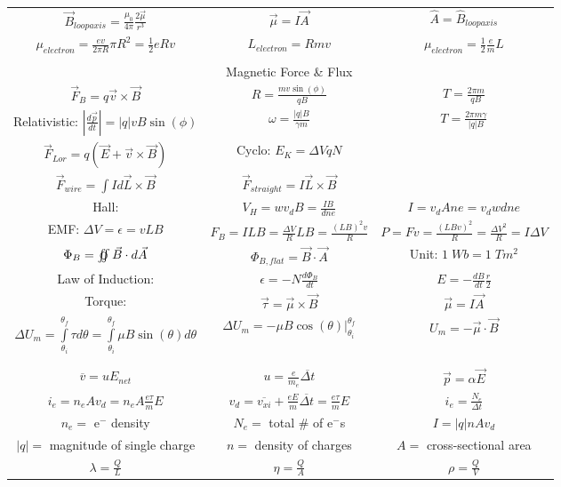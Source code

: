 \documentclass[12pt]{article}
\theoremstyle{definition}
\theoremstyle{remark}
\numberwithin{equation}{section}
\begin{document}
\begin{longtable}{c|c|c}
        $\vec{B}_{loop axis} = \frac{\mu_0}{4\pi}\frac{2\vec{\mu}}{r^3}$ & $\vec{\mu} = I\vec{A}$ & $\hat{A} = \hat{B}_{loop axis}$ \\
        $\mu_{electron} = \frac{ev}{2\pi R}\pi R^2 = \frac{1}{2}eRv$ & $L_{electron} = Rmv$ & $\mu_{electron} = \frac{1}{2}\frac{e}{m}L$ \\
        & &  \\
        & Magnetic Force \& Flux &  \\
        $\vec{F}_B = q\vec{v}\times \vec{B}$ & $R = \frac{mv\sin(\phi)}{qB}$ & $T = \frac{2\pi m}{qB}$ \\
        Relativistic: $\left|\frac{d\vec{p}}{dt}\right| = |q|vB\sin(\phi)$ & $\omega = \frac{|q|B}{\gamma m}$ & $T = \frac{2\pi m\gamma}{|q|B}$ \\
        $\vec{F}_{Lor} = q(\vec{E} + \vec{v} \times \vec{B})$ & Cyclo: $E_K = \Delta VqN$ & \\
        $\vec{F}_{wire} = \int Id\vec{L}\times \vec{B}$ & $\vec{F}_{straight} = I\vec{L} \times \vec{B}$ & \\
        Hall: & $V_H = wv_dB = \frac{IB}{dne}$ & $I = v_dAne = v_dwdne$ \\
        EMF: $\Delta V = \epsilon = vLB$ & $F_B = ILB = \frac{\Delta V}{R}LB = \frac{(LB)^2v}{R}$ & $P = Fv = \frac{(LBv)^2}{R} = \frac{\Delta V^2}{R} = I\Delta V$ \\
        $\Phi_B = \varoiint \vec{B}\cdot d\vec{A}$ & $\Phi_{B,flat} = \vec{B} \cdot \vec{A}$ & Unit: $1\;Wb = 1\;Tm^2$ \\
        Law of Induction: & $\epsilon = -N\frac{d\Phi_B}{dt}$ & $E = -\frac{dB}{dt}\frac{r}{2}$ \\
        Torque: & $\vec{\tau} = \vec{\mu}\times \vec{B}$ & $\vec{\mu} = I\vec{A}$ \\
        $\Delta U_m = \int\limits_{\theta_i}^{\theta_f}\tau d\theta = \int\limits_{\theta_i}^{\theta_f}\mu B\sin(\theta)d\theta$ & $\Delta U_m = - \mu B\cos(\theta)\rvert_{\theta_i}^{\theta_f}$ & $U_m = -\vec{\mu} \cdot \vec{B}$ \\
        & &  \\
        & &  \\
        $\overline{v} = uE_{net}$ & $u = \frac{e}{m_e}\overline{\Delta t}$ & $\vec{p} = \alpha\vec{E}$ \\
        $i_e = n_eAv_d = n_eA\frac{e\tau}{m}E$ & $v_d = \overline{v_{xi}} + \frac{eE}{m}\overline{\Delta t} = \frac{e\tau}{m}E$ & $i_e = \frac{N_e}{\Delta t}$ \\
        $n_e = $ e$^{-}$ density & $N_e = $ total \# of e$^{-}$s & $I = |q|nAv_d$ \\
        $|q| = $ magnitude of single charge & $n = $ density of charges & $A = $ cross-sectional area \\
        $\lambda = \frac{Q}{L}$ & $\eta = \frac{Q}{A}$ & $\rho = \frac{Q}{V}$ 
\end{longtable}
\end{document}
